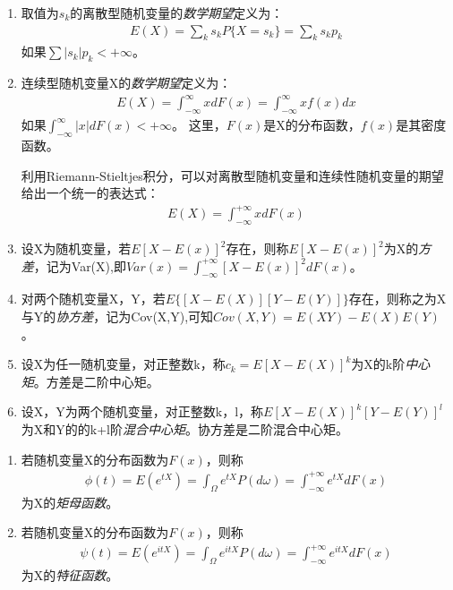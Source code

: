 \begin{definition}\label{def:num-feat}
	\begin{enumerate}[\bfseries (1)]
		\item 取值为\({s_k}\)的离散型随机变量的\emph{数学期望}定义为：
		      \begin{align*}
			      E(X)=\sum_{k}s_k P\{X=s_k\}=\sum_{k}s_k p_k
		      \end{align*}
		      如果\(\sum\left\lvert s_k\right\rvert p_k<+\infty\)。
		\item 连续型随机变量X的\emph{数学期望}定义为：
		      \begin{align*}
			      E(X)=\int_{-\infty}^{\infty}xdF(x)=\int_{-\infty}^{\infty}xf(x)dx
		      \end{align*}
		      如果\(\int_{-\infty}^{\infty} \left\lvert x\right\rvert dF(x)<+\infty\)。
		      这里，\(F(x)\)是X的分布函数，\(f(x)\)是其密度函数。

		      利用Riemann-Stieltjes积分，可以对离散型随机变量和连续性随机变量的期望给出一个统一的表达式：
		      \begin{align*}
			      E(X)=\int_{-\infty}^{+\infty}xdF(x)
		      \end{align*}
		\item 设X为随机变量，若\(E[X-E(x)]^2\)存在，则称\(E[X-E(x)]^2\)为X的\emph{方差}，记为Var(X),即\(Var(x)=\int_{-\infty}^{+\infty}[X-E(x)]^2dF(x)\)。
		\item 对两个随机变量X，Y，若\(E\{[X-E(X)][Y-E(Y)]\}\)存在，则称之为X与Y的\emph{协方差}，记为Cov(X,Y),可知\(Cov(X,Y)=E(XY)-E(X)E(Y)\)。
		\item 设X为任一随机变量，对正整数k，称\(c_k=E[X-E(X)]^k\)为X的k阶\emph{中心矩}。方差是二阶中心矩。
		\item 设X，Y为两个随机变量，对正整数k，l，称\(E[X-E(X)]^k[Y-E(Y)]^l\)为X和Y的的k+l阶\emph{混合中心矩}。协方差是二阶混合中心矩。
	\end{enumerate}
\end{definition}

\begin{definition}\label{def:MomGengun-CharFun}
	\begin{enumerate}[\bfseries (1)]
		\item 若随机变量X的分布函数为\(F(x)\)，则称
		      \begin{align*}
			      \phi(t)=E(e^{tX})=\int_{\Omega}e^{tX}P(d\omega)=\int_{-\infty}^{+\infty}e^{tX}dF(x)
		      \end{align*}
		      为X的\emph{矩母函数}。
		\item 若随机变量X的分布函数为\(F(x)\)，则称
		      \begin{align*}
			      \psi(t)=E(e^{itX})=\int_{\Omega}e^{itX}P(d\omega)=\int_{-\infty}^{+\infty}e^{itX}dF(x)
		      \end{align*}
		      为X的\emph{特征函数}。
	\end{enumerate}
\end{definition}

